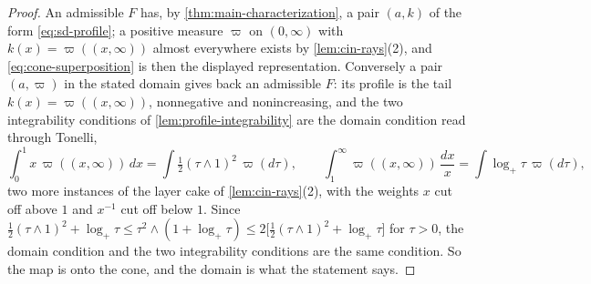 \begin{proof}
\leanok
An admissible $F$ has, by \ref{thm:main-characterization}, a pair $(a,k)$ of the form
\ref{eq:sd-profile}; a positive measure $\varpi$ on $(0,\infty)$ with
$k(x) = \varpi((x,\infty))$ almost everywhere exists by \ref{lem:cin-rays}(2), and
\ref{eq:cone-superposition} is then the displayed representation. Conversely a pair
$(a,\varpi)$ in the stated domain gives back an admissible $F$: its profile is the tail
$k(x) = \varpi((x,\infty))$, nonnegative and nonincreasing, and the two integrability
conditions of \ref{lem:profile-integrability} are the domain condition read through Tonelli,
\[
  \int_0^1 x\,\varpi((x,\infty))\,dx = \int \tfrac12(\tau \wedge 1)^2\,\varpi(d\tau),
  \qquad
  \int_1^\infty \varpi((x,\infty))\,\frac{dx}{x} = \int \log_+\tau\,\varpi(d\tau),
\]
two more instances of the layer cake of \ref{lem:cin-rays}(2), with the weights $x$ cut off
above $1$ and $x^{-1}$ cut off below $1$. Since
$\tfrac12(\tau\wedge1)^2 + \log_+\tau \le \tau^2 \wedge (1 + \log_+\tau)
 \le 2\bigl[\tfrac12(\tau\wedge1)^2 + \log_+\tau\bigr]$ for $\tau > 0$, the domain condition and
the two integrability conditions are the same condition. So the map is onto the cone, and the
domain is what the statement says.


\end{proof}

